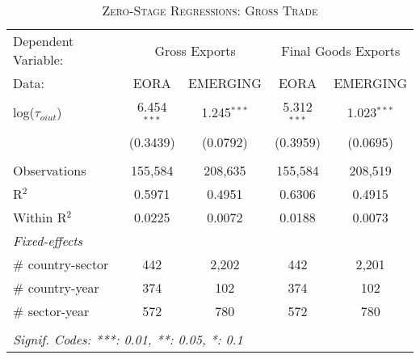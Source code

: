 \documentclass[a4paper]{article}
\begin{document}
\begin{table}[h!]
   \caption{\label{tab:ZS_GT_FULL} \textsc{Zero-Stage Regressions: Gross Trade}}
   \centering
   \begin{tabular}{lcccc}
      \tabularnewline \toprule
      Dependent Variable: & \multicolumn{2}{c}{Gross Exports} & \multicolumn{2}{c}{Final Goods Exports} \\ \cmidrule(lr){2-5}
      Data:                               & EORA           & EMERGING        & EORA           & EMERGING \\   
      \midrule
      log($\tau_{oiut}$)      & 6.454$^{***}$ & 1.245$^{***}$ & 5.312$^{***}$ & 1.023$^{***}$\\  
                                   & (0.3439)      & (0.0792)    & (0.3959)      & (0.0695)\\ \\   
      Observations                 & 155,584       & 208,635       & 155,584       & 208,519\\  
      R$^2$                        & 0.5971        & 0.4951        & 0.6306        & 0.4915\\  
      Within R$^2$                 & 0.0225        & 0.0072        & 0.0188        & 0.0073\\     
      \midrule
      \emph{Fixed-effects}  \\
     \# country-sector            & 442           & 2,202         & 442           & 2,201\\  
      \# country-year              & 374           & 102           & 374           & 102\\  
      \# sector-year               & 572           & 780           & 572           & 780\\  
      \bottomrule \\ [-0.9em]
      \multicolumn{5}{l}{\emph{Signif. Codes: ***: 0.01, **: 0.05, *: 0.1}}\\
   \end{tabular}
   \vspace{-0.5cm}
\end{table}
\FloatBarrier
\end{document}
